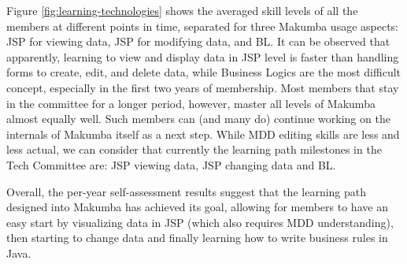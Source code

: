 \documentclass{llncs}
\begin{document}
Figure \ref{fig:learning-technologies} shows the averaged skill levels of all the members at different points in time, separated for three Makumba usage aspects: JSP for viewing data, JSP for modifying data, and BL. It can be observed that apparently, learning to view and display data in JSP level is faster than handling forms to create, edit, and delete data, while Business Logics are the most difficult concept, especially in the first two years of membership. Most members that stay in the committee for a longer period, however, master all levels of Makumba almost equally well. Such members can (and many do) continue working on the internals of Makumba itself  as a next step. While MDD editing skills are less and less actual, we can consider that currently the learning path milestones in the Tech Committee are: JSP viewing data, JSP changing data and BL.

Overall, the per-year self-assessment results suggest that the learning path designed into Makumba has achieved its goal, allowing for members to have an easy start by visualizing data in JSP (which also requires MDD understanding), then starting to change data and finally learning how to write business rules in Java.



\end{document}
